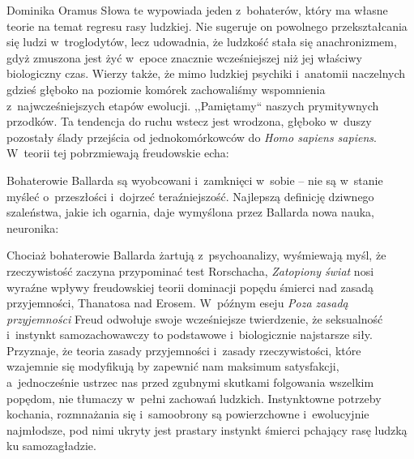 \begin{artplenv}{Dominika Oramus}
Słowa te wypowiada jeden z~bohaterów, który ma własne teorie na temat regresu rasy ludzkiej. Nie sugeruje on powolnego przekształcania się ludzi w~troglodytów, lecz udowadnia, że ludzkość stała się anachronizmem, gdyż zmuszona jest żyć w~epoce znacznie wcześniejszej niż jej właściwy biologiczny czas. Wierzy także, że mimo ludzkiej psychiki i~anatomii naczelnych gdzieś głęboko na poziomie komórek zachowaliśmy wspomnienia z~najwcześniejszych etapów ewolucji. ,,Pamiętamy`` naszych prymitywnych przodków. Ta tendencja do ruchu wstecz jest wrodzona, głęboko w~duszy pozostały ślady przejścia od jednokomórkowców do \textit{Homo sapiens sapiens}. W~teorii tej pobrzmiewają freudowskie echa:


Bohaterowie Ballarda są wyobcowani i~zamknięci w~sobie -- nie są w~stanie myśleć o~przeszłości i~dojrzeć teraźniejszość. Najlepszą definicję dziwnego szaleństwa, jakie ich ogarnia, daje wymyślona przez Ballarda nowa nauka, neuronika:


Chociaż bohaterowie Ballarda żartują z~psychoanalizy, wyśmiewają myśl, że rzeczywistość zaczyna przypominać test Rorschacha, \textit{Zatopiony świat} nosi wyraźne wpływy freudowskiej teorii dominacji popędu śmierci nad zasadą przyjemności, Thanatosa nad Erosem. W~późnym eseju \textit{Poza zasadą przyjemności}
Freud 
\parencite*[][]{freud_poza_1994} %
odwołuje swoje wcześniejsze twierdzenie, że seksualność i~instynkt samozachowawczy to podstawowe i~biologicznie najstarsze siły. Przyznaje, że teoria zasady przyjemności i~zasady rzeczywistości, które wzajemnie się modyfikują by zapewnić nam maksimum satysfakcji, a~jednocześnie ustrzec nas przed zgubnymi skutkami folgowania wszelkim popędom, nie tłumaczy w~pełni zachowań ludzkich. Instynktowne potrzeby kochania, rozmnażania się i~samoobrony są powierzchowne i~ewolucyjnie najmłodsze, pod nimi ukryty jest prastary instynkt śmierci pchający rasę ludzką ku samozagładzie.


\end{artplenv}
